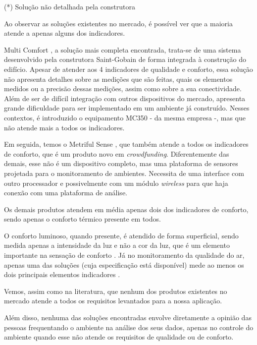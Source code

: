 \documentclass[../monografia.tex]{subfiles}
\begin{document}
\begin{flushright}
(*) Solução não detalhada pela construtora
\end{flushright}

Ao observar as soluções existentes no mercado, é possível ver que a maioria atende a apenas alguns dos indicadores. 

Multi Comfort \cite{multicomfort}, a solução mais completa encontrada, trata-se de uma sistema desenvolvido pela construtora Saint-Gobain de forma integrada à construção do edifício. 
Apesar de atender aos 4 indicadores de qualidade e conforto, essa solução não apresenta detalhes sobre as medições que são feitas, quais os elementos medidos ou a precisão dessas medições, assim como sobre a sua conectividade. 
Além de ser de difícil integração com outros dispositivos do mercado, apresenta grande dificuldade para ser implementado em um ambiente já construído. Nesses contextos, é introduzido o equipamento MC350\cite{mc350} - da mesma empresa -, mas que não atende mais a todos os indicadores. 

Em seguida, temos o Metriful Sense \cite{metriful}, que também atende a todos os indicadores de conforto, que é um produto novo em \textit{crowdfunding}. Diferentemente das demais, esse não é um dispositivo completo, mas uma plataforma de sensores projetada para o monitoramento de ambientes. Necessita de uma interface com outro processador e possivelmente com um módulo \textit{wireless} para que haja conexão com uma plataforma de análise. 

Os demais produtos atendem em média apenas dois dos indicadores de conforto, sendo apenas o conforto térmico presente em todos. 

O conforto luminoso, quando presente, é atendido de forma superficial, sendo medida apenas a intensidade da luz e não a cor da luz, que é um elemento importante na sensação de conforto \cite{VisualComfort}. Já no monitoramento da qualidade do ar, apenas uma das soluções \cite{ECOMLITE} (cuja especificação está disponível) mede ao menos os dois principais elementos indicadores \cite{AirQuality}. 

Vemos, assim como na literatura, que nenhum dos produtos existentes no mercado atende a todos os requisitos levantados para a nossa aplicação. 

Além disso, nenhuma das soluções encontradas envolve diretamente a opinião das pessoas frequentando o ambiente na análise dos seus dados, apenas no controle do ambiente quando esse não atende os requisitos de qualidade ou de conforto. 
\end{document}
